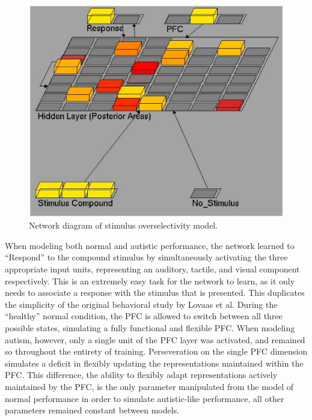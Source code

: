 \begin{figure}
\begin{center}
	\includegraphics[width=125mm]{figures/overselectivity_network.ps}
\end{center}
\caption{Network diagram of stimulus overselectivity model.} 
\label{network-diagram-2}
\end{figure}



When modeling both normal and autistic performance, the network learned to ``Respond'' to the compound stimulus by simultaneously activating the three appropriate input units, representing an auditory, tactile, and visual component respectively.  This is an extremely easy task for the network to learn, as it only needs to associate a response with the stimulus that is presented.  This duplicates the simplicity of the original behavioral study by Lovaas et al.  During the ``healthy'' normal condition, the PFC is allowed to switch between all three possible states, simulating a fully functional and flexible PFC.  When modeling autism, however, only a single unit of the PFC layer was activated, and remained so throughout the entirety of training.   Perseveration on the single PFC dimension simulates a deficit in flexibly updating the representations maintained within the PFC.  This difference, the ability to flexibly adapt representations actively maintained by the PFC, is the only parameter manipulated from the model of normal performance in order to simulate autistic-like performance, all other parameters remained constant between models.

